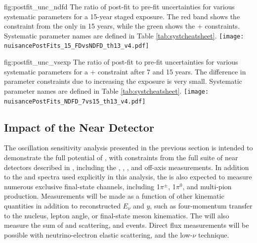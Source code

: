\begin{dunefigure}{fig:postfit_unc_ndfd}
{The ratio of post-fit to pre-fit uncertainties for various systematic parameters for a 15-year staged exposure. The red band shows the constraint from the  only in 15 years, while the green shows the + constraints. Systematic parameter names are defined in Table \ref{tab:systcheatsheet}.}
  \texttt{[image: nuisancePostFits\_15\_FDvsNDFD\_th13\_v4.pdf]}
\end{dunefigure}

\begin{dunefigure}{fig:postfit_unc_vsexp}
{The ratio of post-fit to pre-fit uncertainties for various systematic parameters for a + constraint after 7 and 15 years. The difference in parameter constraints due to increasing the exposure is very small. Systematic parameter names are defined in Table \ref{tab:systcheatsheet}.}
  \texttt{[image: nuisancePostFits\_NDFD\_7vs15\_th13\_v4.pdf]}
\end{dunefigure}




\subsection{Impact of the Near Detector}
\label{sec:ndimpact}

The oscillation sensitivity analysis presented in the previous section is intended to demonstrate the full potential of , with constraints from the full suite of near detectors described in \introchnd, including the  , , , and off-axis measurements. In addition to the \numu and \anumu {} spectra used explicitly in this analysis, the   is also expected to measure numerous exclusive final-state  channels, including 1$\pi^{\pm}$, 1$\pi^0$, and multi-pion production. Measurements will be made as a function of other kinematic quantities in addition to reconstructed $E_{\nu}$ and $y$, such as four-momentum transfer to the nucleus, lepton angle, or final-state meson kinematics. The   will also measure the sum of \nue and \anue {} scattering, and  events. Direct flux measurements will be possible with neutrino-electron elastic scattering, and the low-$\nu$ technique.

